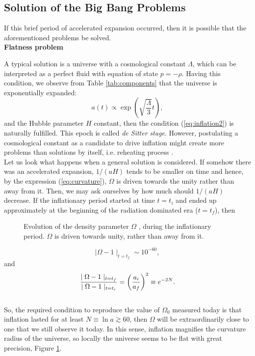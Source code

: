 \documentclass{rmaa}
\def\beq{\begin{equation}}
\def\eeq{\end{equation}}
\begin{document}
\subsection{Solution of the Big Bang Problems}
If this brief period of accelerated expansion occurred, then it is possible that the 
aforementioned problems be solved.
\\

\noindent
\textbf {Flatness problem}
\vskip 6pt
 
A typical solution is a universe with a cosmological constant $\Lambda$, which can be 
interpreted as a perfect fluid with equation of state $p=-\rho$. Having this condition, 
we observe from Table \ref{tab:components} that  the universe is exponentially expanded:
%
\beq
a(t)\propto \exp(\sqrt{\frac{\Lambda}{3}}t),
\eeq
and the Hubble parameter $H$ constant, then the condition  
(\ref{eq:inflation2}) is naturally fulfilled. This epoch is called \textit{de Sitter stage}.
However, postulating a cosmological constant as a candidate to drive inflation might create more problems than
solutions by itself, i.e. reheating process \citep{Carrol01}.
\\

Let us look what happens when a general solution is considered.
If somehow there was an accelerated expansion, $1/(aH)$ tends to be smaller on time and hence,
by the expression (\ref{eq:curvature}), $\Omega$ is driven towards the unity rather than away from it. 
Then, we may ask ourselves by how much should $1/(aH)$ decrease. 
If the inflationary period started at time $t=t_i$ 
and ended up approximately at the beginning of the radiation dominated era ($t=t_f$), then 

\begin{figure}[t!] 
\centerline{ \epsfxsize=200pt  }
\caption{Evolution of the density parameter $\Omega$ , during the inflationary period. $\Omega$ is
driven towards unity, rather than away from it.}%
\label{fig:curvature}
\end{figure}

$$
\mid \Omega -1\mid_{t=t_f}\sim10^{-60},
$$
and
\beq
\frac{\mid \Omega -1\mid_{t=t_f}}{\mid \Omega -1\mid_{t=t_i}}= \left( a_i \over a_f \right)^2\equiv e^{-2N}.
\eeq
\\

So, the required condition to reproduce the value of $\Omega_0$  measured today is 
that inflation lasted for at least $N\equiv\ln a \gtrsim 60 $, then $\Omega$ will be
extraordinarily close to one that we still observe it today.
In this sense, inflation magnifies the curvature radius of the universe, so 
locally the universe seems to be flat with great precision, Figure \ref{fig:curvature}.
\end{document}
